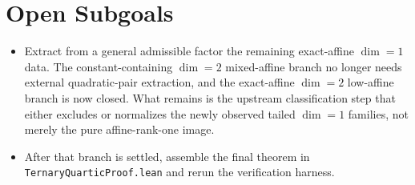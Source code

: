 \documentclass[11pt]{article}
\begin{document}
\section*{Open Subgoals}
\begin{itemize}
\item Extract from a general admissible factor the remaining exact-affine
\(\dim=1\) data. The constant-containing \(\dim=2\) mixed-affine branch no
longer needs external quadratic-pair extraction, and the exact-affine
\(\dim=2\) low-affine branch is now closed. What remains is the upstream
classification step that either excludes or normalizes the newly observed
tailed \(\dim=1\) families, not merely the pure affine-rank-one image.
\item After that branch is settled, assemble the final theorem in
\texttt{TernaryQuarticProof.lean} and rerun the verification harness.
\end{itemize}
\end{document}
